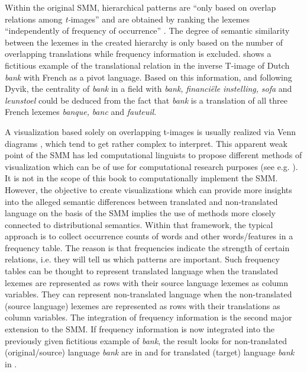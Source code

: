 Within the original SMM, hierarchical patterns are “only based on overlap relations among \textit{t-}images” and are obtained by ranking the lexemes “independently of frequency of occurrence” \citep[73]{johansson_translational_1998}. The degree of semantic similarity between the lexemes in the created hierarchy is only based on the number of overlapping translations while frequency information is excluded.  shows a fictitious example of the translational relation in the inverse T-image of Dutch \textit{bank} with French as a pivot language. Based on this information, and following Dyvik, the centrality of \textit{bank} in a field with \textit{bank,} \textit{financiële} \textit{instelling,} \textit{sofa} and \textit{leunstoel} could be deduced from the fact that \textit{bank} is a translation of all three French lexemes \textit{banque,} \textit{banc} and \textit{fauteuil}.

A visualization based solely on overlapping t-images is usually realized via Venn diagrams \citep{dyvik_semantic_2011}, which tend to get rather complex to interpret. This apparent weak point of the SMM has led computational linguists to propose different methods of visualization which can be of use for computational research purposes (see e.g. \citealt{ganter_conceptual_2005}). It is not in the scope of this book to computationally implement the SMM. However, the objective to create visualizations which can provide more insights into the alleged semantic differences between translated and non-translated language on the basis of the SMM implies the use of methods more closely connected to distributional semantics. Within that framework, the typical approach is to collect occurrence counts of words and other words\slash features in a frequency table. The reason is that frequencies indicate the strength of certain relations, i.e. they will tell us which patterns are important. Such frequency tables can be thought to represent translated language when the translated lexemes are represented as rows with their source language lexemes as column variables. They can represent non-translated language when the non-translated (source language) lexemes are represented as rows with their translations as column variables. The integration of frequency information is the second major extension to the SMM. If frequency information is now integrated into the previously given fictitious example of \textit{bank}, the result looks for non-translated (original\slash source) language \textit{bank} are in  and for translated (target) language \textit{bank} in .

